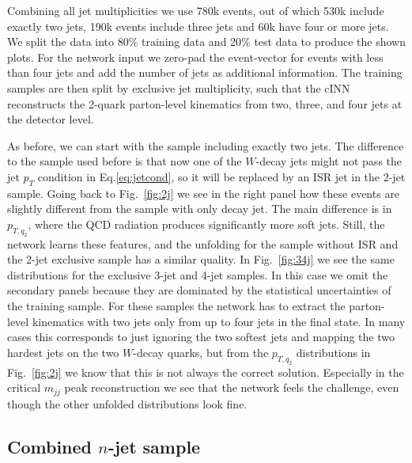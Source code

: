 Combining all jet multiplicities we use 780k events, out of which 530k
include exactly two jets, 190k events include three jets and 60k have
four or more jets. We split the data into 80\% training data and 20\%
test data to produce the shown plots.  For the network input we
zero-pad the event-vector for events with less than four jets and add
the number of jets as additional information. The training samples are
then split by exclusive jet multiplicity, such that the cINN
reconstructs the 2-quark parton-level kinematics from two, three, and
four jets at the detector level.

As before, we can start with the sample including exactly two
jets. The difference to the sample used before is that now one of the
$W$-decay jets might not pass the jet $p_T$ condition in Eq.\eqref{eq:jetcond}, so it
will be replaced by an ISR jet in the 2-jet sample. Going back to
Fig.~\ref{fig:2j} we see in the right panel how these events are
slightly different from the sample with only decay jet. The main
difference is in $p_{T,q_2}$, where the QCD radiation produces
significantly more soft jets. Still, the network learns these
features, and the unfolding for the sample without ISR and the 2-jet
exclusive sample has a similar quality. In Fig.~\ref{fig:34j} we see
the same distributions for the exclusive 3-jet and 4-jet samples. In
this case we omit the secondary panels because they are dominated by
the statistical uncertainties of the training sample. For these samples the network
has to extract the parton-level kinematics with two jets only from up
to four jets in the final state. In many cases this corresponds to
just ignoring the two softest jets and mapping the two hardest jets on
the two $W$-decay quarks, but from the $p_{T,q_2}$ distributions in
Fig.~\ref{fig:2j} we know that this is not always the correct
solution. Especially in the critical $m_{jj}$ peak reconstruction we
see that the network feels the challenge, even though the other
unfolded distributions look fine.

\subsection{Combined $n$-jet sample}
\label{sec:jets_all}

